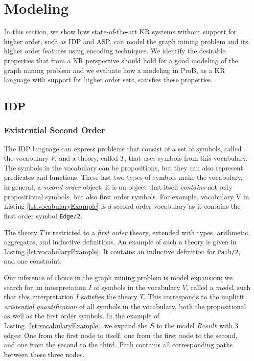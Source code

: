 \section{Modeling}\label{sec:modeling}
In this section, we show how state-of-the-art KR systems without support for higher order, such as IDP and ASP, can model the graph mining problem and its higher order features using encoding techniques.
We identify the desirable properties that from a KR perspective should hold for a good modeling of the graph mining problem and we evaluate how a modeling in ProB, as a KR language with support for higher order sets, satisfies these properties.

\subsection{IDP}
\subsubsection{Existential Second Order}
The IDP language can express problems that consist of a set of symbols, called the vocabulary $V$, and a theory, called $T$, that uses symbols from this vocabulary.
The symbols in the vocabulary can be propositions, but they can also represent predicates and functions.
These last two types of symbols make the vocabulary, in general, a \emph{second order} object: it is an object that itself \emph{contains} not only propositional symbols, but also first order symbols.
For example, vocabulary V in Listing \ref{lst:vocabularyExample} is a second order vocabulary as it contains the first order symbol \lstinline{Edge/2}.

The theory $T$ is restricted to a \emph{first order} theory, extended with types, arithmetic, aggregates, and inductive definitions.
An example of such a theory is given in Listing \ref{lst:vocabularyExample}.
It contains an inductive definition for \lstinline{Path/2}, and one constraint.

Our inference of choice in the graph mining problem is model expansion; we search for an interpretation $I$ of symbols in the vocabulary $V$, called a \emph{model}, such that this interpretation $I$ satisfies the theory $T$.
This corresponds to the implicit \emph{existential quantification} of all symbols in the vocabulary, both the propositional as well as the first order symbols.
In the example of Listing~\ref{lst:vocabularyExample}, we expand the $S$ to the model $Result$ with 3 edges: One from the first node to itself, one from the first node to the second, and one from the second to the third.
Path contains all corresponding paths between these three nodes.

